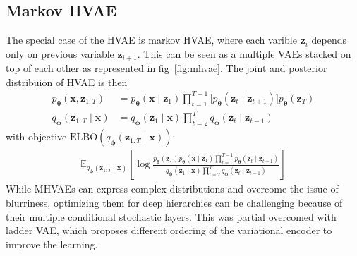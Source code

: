 \subsection{Markov HVAE}
The special case of the HVAE is markov HVAE, where each varible $\boldsymbol{z}_i$ depends only on previous variable $\boldsymbol{z}_{i+1}$. This can be
seen as a multiple VAEs stacked on top of each other as represented in fig~\ref{fig:mhvae}. The joint and posterior distribuion of HVAE is then
\begin{align*}
    p_{\boldsymbol{\theta}}(\boldsymbol{x},\boldsymbol{z}_{1:T})&=p_{\boldsymbol{\theta}}(\boldsymbol{x}\mid\boldsymbol{z}_1)\prod_{t=1}^{T-1} \bigl[   p_{\boldsymbol{\theta}}(\boldsymbol{z}_{t}\mid\boldsymbol{z}_{t+1}) \bigr]  p_{\boldsymbol{\theta}}(\boldsymbol{z}_{T}) \\
    q_{\boldsymbol{\phi}}(\boldsymbol{z}_{1:T}\mid\boldsymbol{x}) &= q_{\boldsymbol{\phi}}(\boldsymbol{z}_1\mid\boldsymbol{x})\prod_{t=2}^{T}q_{\boldsymbol{\phi}}(\boldsymbol{z}_{t}\mid\boldsymbol{z}_{t-1}) 
\end{align*}
with objective $\mathrm{ELBO}(q_{\boldsymbol{\phi}}(\boldsymbol{z}_{1:T}\mid\boldsymbol{x}))$:
\begin{align*}
    \mathbb{E}_{q_{\boldsymbol{\phi}}(\boldsymbol{z}_{1:T}\mid\boldsymbol{x})}\left[\log \frac{p_{\boldsymbol{\theta}}(\boldsymbol{z}_T)p_{\boldsymbol{\theta}}(\boldsymbol{x}\mid\boldsymbol{z}_1)\prod_{t=1}^{T-1}p_{\boldsymbol{\theta}}(\boldsymbol{z}_{t}\mid\boldsymbol{z}_{t+1})}{q_{\boldsymbol{\phi}}(\boldsymbol{z}_1\mid\boldsymbol{x})\prod_{t=2}^{T}q_{\boldsymbol{\phi}}(\boldsymbol{z}_{t}\mid\boldsymbol{z}_{t-1})}\right]
\end{align*}
While MHVAEs can express complex distributions and overcome the issue of blurriness, optimizing them for deep hierarchies can be challenging because of their multiple conditional stochastic layers.
This was partial overcomed with ladder VAE, which proposes different ordering of the variational encoder to improve the learning. 
